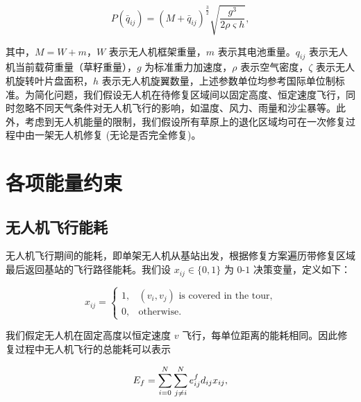 \documentclass[AutoFakeBold]{LZUThesis}
\begin{document}
\begin{equation} \label{approximation-power-consumption}
	P(\bar{q}_{ij}) = (M + \bar{q}_{ij})^{\frac{3}{2}}\sqrt{\frac{g^3}{2 \rho \varsigma h}},
\end{equation}

其中，$M = W + m$，$W$ 表示无人机框架重量，$m$ 表示其电池重量。$q_{ij}$ 表示无人机当前载荷重量（草籽重量），$g$ 为标准重力加速度，$\rho$ 表示空气密度，$\zeta$ 表示无人机旋转叶片盘面积，$h$ 表示无人机旋翼数量，上述参数单位均参考国际单位制标准。为简化问题，我们假设无人机在待修复区域间以固定高度、恒定速度飞行，同时忽略不同天气条件对无人机飞行的影响，如温度、风力、雨量和沙尘暴等。此外，考虑到无人机能量的限制，我们假设所有草原上的退化区域均可在一次修复过程中由一架无人机修复 (无论是否完全修复)。



\section{各项能量约束}

\subsection{无人机飞行能耗}

无人机飞行期间的能耗，即单架无人机从基站出发，根据修复方案遍历带修复区域最后返回基站的飞行路径能耗。我们设 $x_{ij} \in \{0,1\}$ 为 $0$-$1$ 决策变量，定义如下：

\begin{equation}
	x_{ij} =
	\begin{cases}
		1, & \mbox{$(v_i,v_j)$ is covered in the tour,} \\
		0, & \mbox{otherwise}.
	\end{cases}
\end{equation}

我们假定无人机在固定高度以恒定速度 $v$ 飞行，每单位距离的能耗相同。因此修复过程中无人机飞行的总能耗可以表示

\begin{equation} \label{flight-energy}
	\begin{scriptsize}
		E_f =  \sum^N_{i=0}\sum^N_{j \neq i} e^f_{ij} d_{ij} x_{ij},
	\end{scriptsize}
\end{equation}
\end{document}
